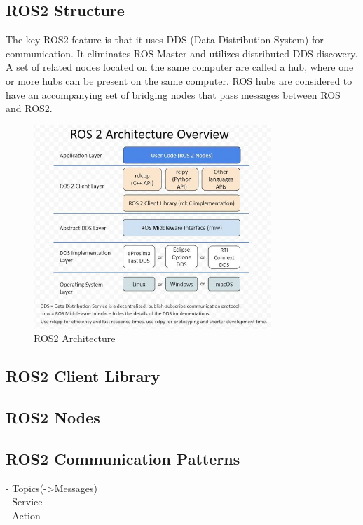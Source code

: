 	\subsection{ROS2 Structure}
	\label{Grundlagen:ROS2:ROS2_Structure}
	The key ROS2 feature is that it uses DDS (Data Distribution System) for communication. It eliminates ROS Master and utilizes distributed DDS discovery.	A set of related nodes located on the same computer are called a hub, where one or more hubs can be present on the same computer. ROS hubs are considered to have an accompanying set of bridging nodes that pass messages between ROS and ROS2.\cite*[P.7]{Koubaa2021}
	\begin{figure}[H]
		\centering
		\includegraphics[width=0.8\textwidth]{"Bilder/ros-architecture.jpg"}
		\caption{ROS2 Architecture \cite{ros-2-architecture}}
		\label{fig:Background:Containers:Ros2_Architecture}					
	\end{figure}
	
	\subsection{ROS2 Client Library}
	\label{Grundlagen:ROS2:ROS2ClientLibrary}

	\subsection{ROS2 Nodes}
	\label{Grundlagen:ROS2:ROS2Nodes}

	\subsection{ROS2 Communication Patterns}
	\label{Grundlagen:ROS2:CommunicationPatterns}
		- Topics(->Messages)\\
		- Service\\
		- Action
	
